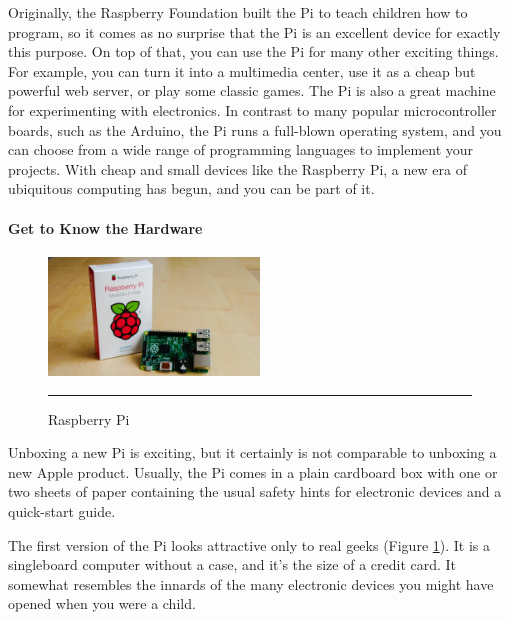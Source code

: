 Originally, the Raspberry Foundation \citep{2} built the Pi to teach children how to
program, so it comes as no surprise that the Pi is an excellent device for
exactly this purpose. 
On top of that, you can use the Pi for many other
exciting things. For example, you can turn it into a multimedia center, use it as a cheap but powerful web server, or play some classic games.
The Pi is also a great machine for experimenting with electronics. In contrast
to many popular microcontroller boards, such as the Arduino, the Pi runs a
full-blown operating system, and you can choose from a wide range of programming
languages to implement your projects.
With cheap and small devices like the Raspberry Pi, a new era of ubiquitous
computing has begun, and you can be part of it.\cite{10}



\paragraph*{Get to Know the Hardware}

\begin{figure}
\vspace{15pt}
  \begin{center}
    \includegraphics[width=0.5\textwidth]{./Pictures/unboxing_pi.jpg}
  \end{center}
  \rule{0.5\textwidth}{0.5pt}
  \caption{Raspberry Pi }
  \label{fig:unboxing_pi}
\end{figure}

\hfill \break
Unboxing a new Pi is exciting, but it certainly is not comparable to unboxing
a new Apple product. Usually, the Pi comes in a plain cardboard box with
one or two sheets of paper containing the usual safety hints for electronic
devices and a quick-start guide.\cite{12}

The first version of the Pi looks attractive only to real geeks (Figure \ref{fig:unboxing_pi}). It is a singleboard
computer without a case, and it’s the size of a credit card. It somewhat
resembles the innards of the many electronic devices you might have opened
when you were a child.\cite{12}

